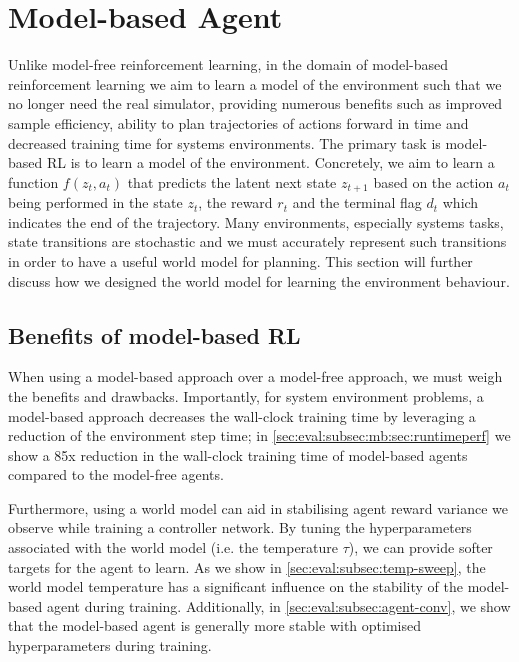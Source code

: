 \section{Model-based Agent}
\label{sec:rlopt:subsec:mb-agent}
Unlike model-free reinforcement learning, in the domain of model-based reinforcement learning we aim to learn a model of the environment such that we no longer need the real simulator, providing numerous benefits such as improved sample efficiency, ability to plan trajectories of actions forward in time and decreased training time for systems environments. The primary task is model-based RL is to learn a model of the environment. Concretely, we aim to learn a function $f(z_t, a_t)$ that predicts the latent next state $z_{t+1}$ based on the action $a_t$ being performed in the state $z_t$, the reward $r_t$ and the terminal flag $d_t$ which indicates the end of the trajectory. Many environments, especially systems tasks, state transitions are stochastic and we must accurately represent such transitions in order to have a useful world model for planning. This section will further discuss how we designed the world model for learning the environment behaviour.

\subsection{Benefits of model-based RL}
When using a model-based approach over a model-free approach, we must weigh the benefits and drawbacks. Importantly, for system environment problems, a model-based approach decreases the wall-clock training time by leveraging a reduction of the environment step time; in \autoref{sec:eval:subsec:mb:sec:runtimeperf} we show a 85x reduction in the wall-clock training time of model-based agents compared to the model-free agents.

Furthermore, using a world model can aid in stabilising agent reward variance we observe while training a controller network. By tuning the hyperparameters associated with the world model (i.e. the temperature $\tau$), we can provide softer targets for the agent to learn. As we show in \autoref{sec:eval:subsec:temp-sweep}, the world model temperature has a significant influence on the stability of the model-based agent during training. Additionally, in \autoref{sec:eval:subsec:agent-conv}, we show that the model-based agent is generally more stable with optimised hyperparameters during training.

